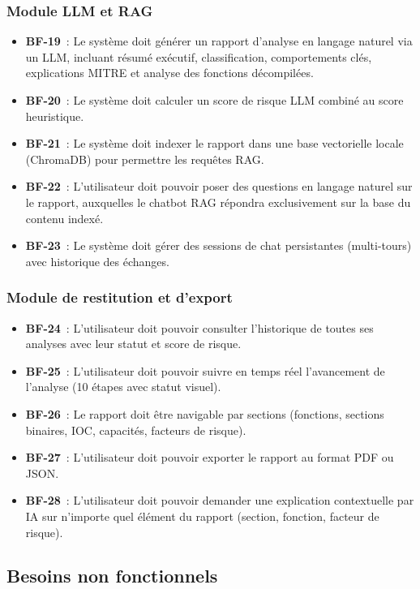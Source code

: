 \subsubsection{Module LLM et RAG}
\begin{itemize}
  \item \textbf{BF-19}~: Le système doit générer un rapport d'analyse en langage naturel via un LLM, incluant résumé exécutif, classification, comportements clés, explications MITRE et analyse des fonctions décompilées.
  \item \textbf{BF-20}~: Le système doit calculer un score de risque LLM combiné au score heuristique.
  \item \textbf{BF-21}~: Le système doit indexer le rapport dans une base vectorielle locale (ChromaDB) pour permettre les requêtes RAG.
  \item \textbf{BF-22}~: L'utilisateur doit pouvoir poser des questions en langage naturel sur le rapport, auxquelles le chatbot RAG répondra exclusivement sur la base du contenu indexé.
  \item \textbf{BF-23}~: Le système doit gérer des sessions de chat persistantes (multi-tours) avec historique des échanges.
\end{itemize}

\subsubsection{Module de restitution et d'export}
\begin{itemize}
  \item \textbf{BF-24}~: L'utilisateur doit pouvoir consulter l'historique de toutes ses analyses avec leur statut et score de risque.
  \item \textbf{BF-25}~: L'utilisateur doit pouvoir suivre en temps réel l'avancement de l'analyse (10 étapes avec statut visuel).
  \item \textbf{BF-26}~: Le rapport doit être navigable par sections (fonctions, sections binaires, IOC, capacités, facteurs de risque).
  \item \textbf{BF-27}~: L'utilisateur doit pouvoir exporter le rapport au format PDF ou JSON.
  \item \textbf{BF-28}~: L'utilisateur doit pouvoir demander une explication contextuelle par IA sur n'importe quel élément du rapport (section, fonction, facteur de risque).
\end{itemize}

\subsection{Besoins non fonctionnels}

